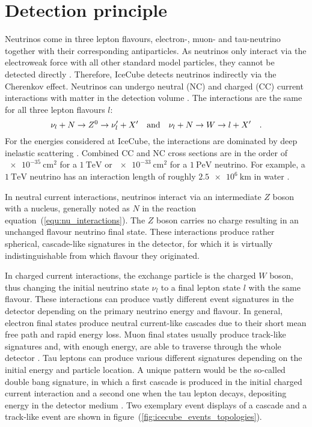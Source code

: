 \section{Detection principle}
Neutrinos come in three lepton flavours, electron-, muon- and tau-neutrino together with their corresponding antiparticles.
As neutrinos only interact via the electroweak force with all other standard model particles, they cannot be detected directly \cite{Patrignani:2016xqp}.
Therefore, IceCube detects neutrinos indirectly via the Cherenkov effect.
Neutrinos can undergo neutral (NC) and charged (CC) current interactions with matter in the detection volume \cite{Fisk:1982ccnc}.
The interactions are the same for all three lepton flavours $l$:
\begin{equation}
  \label{equ:nu_interactions}
  \nu_l + N \rightarrow Z^0 \rightarrow \nu'_l + X'
  \quad\text{and}\quad
  \nu_l + N \rightarrow W \rightarrow l + X'
  \quad\text{.}
\end{equation}
For the energies considered at IceCube, the interactions are dominated by deep inelastic scattering \cite{CooperSarkar:2011pa}.
Combined CC and NC cross sections are in the order of $\SI{e-35}{\cm\squared}$ for a $\SI{1}{\TeV}$ or $\SI{e-33}{\cm\squared}$ for a $\SI{1}{\peta\eV}$ neutrino.
For example, a $\SI{1}{\TeV}$ neutrino has an interaction length of roughly $\SI{2.5e6}{\km}$ in water \cite{Gandhi:1995tf}.

In neutral current interactions, neutrinos interact via an intermediate $Z$ boson with a nucleus, generally noted as $N$ in the reaction equation~(\ref{equ:nu_interactions}).
The $Z$ boson carries no charge resulting in an unchanged flavour neutrino final state.
These interactions produce rather spherical, cascade-like signatures in the detector, for which it is virtually indistinguishable from which flavour they originated.

In charged current interactions, the exchange particle is the charged $W$ boson, thus changing the initial neutrino state $\nu_l$ to a final lepton state $l$ with the same flavour.
These interactions can produce vastly different event signatures in the detector depending on the primary neutrino energy and flavour.
In general, electron final states produce neutral current-like cascades due to their short mean free path and rapid energy loss.
Muon final states usually produce track-like signatures and, with enough energy, are able to traverse through the whole detector \cite{Katz:2011ke}.
Tau leptons can produce various different signatures depending on the initial energy and particle location.
A unique pattern would be the so-called double bang signature, in which a first cascade is produced in the initial charged current interaction and a second one when the tau lepton decays, depositing energy in the detector medium \cite{Cowen:2007NuTaus}.
Two exemplary event displays of a cascade and a track-like event are shown in figure~(\ref{fig:icecube_events_topologies}).

